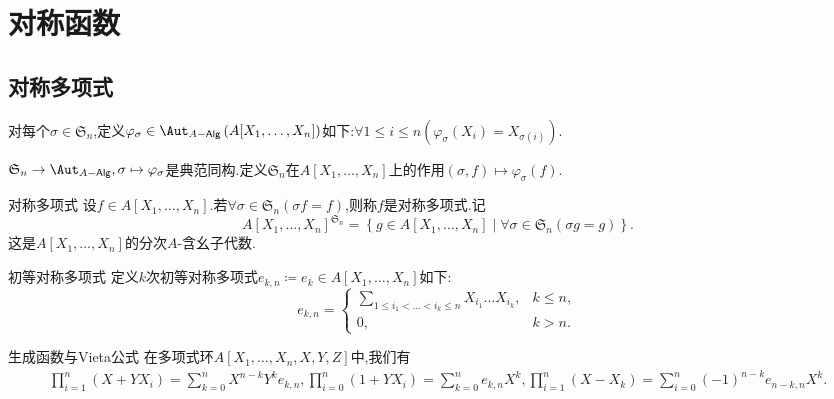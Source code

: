\chapter{对称函数}

\section{对称多项式}

\begin{definition}{}{}
	对每个$\sigma\in\mathfrak{S}_{n}$,定义$\varphi_{\sigma}\in\Aut_{A-\mathsf{Alg}}\left(A[X_{1},\ldots,X_{n}]\right)$如下:$\forall 1\leq i\leq n\left(\varphi_{\sigma}\left(X_{i}\right)=X_{\sigma\left(i\right)}\right)$.
\end{definition}

\begin{remark}{}{}
	$\mathfrak{S}_{n}\to\Aut_{A-\mathsf{Alg}},\sigma\mapsto\varphi_{\sigma}$是典范同构.定义$\mathfrak{S}_{n}$在$A[X_{1},\ldots,X_{n}]$上的作用$\left(\sigma,f\right)\mapsto\varphi_{\sigma}\left(f\right)$.
\end{remark}

\begin{definition}{对称多项式}{}
	设$f\in A[X_{1},\ldots,X_{n}]$.若$\forall\sigma\in\mathfrak{S}_{n}\left(\sigma f=f\right)$,则称$f$是对称多项式.记
	\begin{equation*}
		A[X_{1},\ldots,X_{n}]^{\mathfrak{S}_{n}}=\left\{g\in A[X_{1},\ldots,X_{n}]\middle|\forall\sigma\in\mathfrak{S}_{n}\left(\sigma g=g\right)\right\}.
	\end{equation*}
	这是$A[X_{1},\ldots,X_{n}]$的分次$A$-含幺子代数.
\end{definition}

\begin{definition}{初等对称多项式}{}
	定义$k$次初等对称多项式$e_{k,n}\coloneq e_{k}\in A[X_{1},\ldots,X_{n}]$如下:
	\begin{equation*}
		e_{k,n}=
		\begin{cases}
			\sum\limits_{1\leq i_{1}<\ldots<i_{k}\leq n}X_{i_{1}}\ldots X_{i_{k}},&k\leq n,\\
			0,&k>n.
		\end{cases}
	\end{equation*}
\end{definition}

\begin{proposition}{生成函数与Vieta公式}{}
	在多项式环$A[X_{1},\ldots,X_{n},X,Y,Z]$中,我们有
	\begin{align*}
		\prod\limits_{i=1}^{n}\left(X+YX_{i}\right)=\sum\limits_{k=0}^{n}X^{n-k}Y^{k}e_{k,n},\prod\limits_{i=0}^{n}\left(1+YX_{i}\right)=\sum\limits_{k=0}^{n}e_{k,n}X^{k},\prod\limits_{i=1}^{n}\left(X-X_{k}\right)=\sum\limits_{i=0}^{n}\left(-1\right)^{n-k}e_{n-k,n}X^{k}.
	\end{align*}
\end{proposition}


